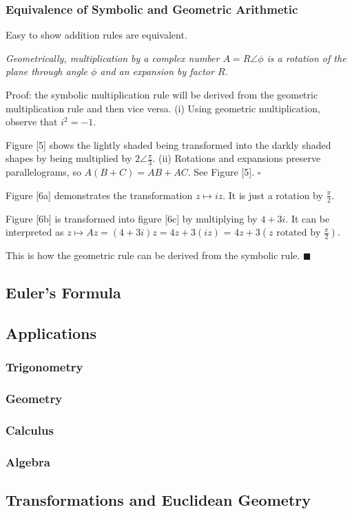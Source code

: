 \begin{card}
\subsubsection{Equivalence of Symbolic and Geometric Arithmetic}

Easy to show addition rules are equivalent.

\textsl{Geometrically, multiplication by a complex number $A = R\angle\phi$
is a rotation of the plane through angle $\phi$ and an expansion by factor
$R$.}

Proof: the symbolic multiplication rule will be derived
from the geometric multiplication rule and
then vice versa. (i) Using geometric multiplication,
observe that $i^2 = -1$.

Figure [5] shows the lightly shaded being transformed into the darkly shaded shapes
by being multiplied by $2 \angle \frac{\pi}{3}$.
(ii) Rotations and expansions preserve parallelograms, so $A(B + C) = AB + AC$.
See Figure [5]. $\square$

Figure [6a] demonstrates the transformation $z \mapsto iz$.
It is just a rotation by $\frac{\pi}{2}$.

Figure [6b] is transformed into figure [6c] by multiplying by $4 + 3i$.
It can be interpreted as
$z \mapsto Az = (4 + 3i)z = 4z + 3(iz)$
= $4z + 3(z \text{ rotated by } \frac{\pi}{2})$.

This is how the geometric rule can be derived from the symbolic rule.
$\blacksquare$
\end{card}

\subsection{Euler's Formula}

\subsection{Applications}
\subsubsection{Trigonometry}
\subsubsection{Geometry}
\subsubsection{Calculus}
\subsubsection{Algebra}

\subsection{Transformations and Euclidean Geometry}

